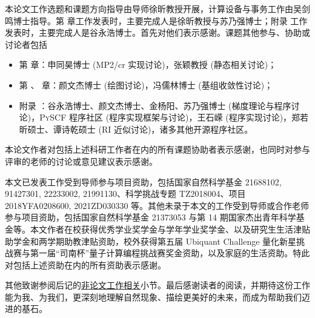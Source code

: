 
\begin{acknowledgements}
\label{sec.acknoledge}

本论文工作选题和课题方向指导由导师徐昕教授开展，计算设备与事务工作由吴剑鸣博士指导。第  章工作发表时，主要完成人是徐昕教授与苏乃强博士；附录  工作发表时，主要完成人是谷永浩博士。首先对他们表示感谢。课题其他参与、协助或讨论者包括
\begin{itemize}[nosep]
    \item 第  章：申同昊博士 (MP2/cr 实现讨论)，张颖教授 (静态相关讨论)；
    \item 第 、 章：颜文杰博士 (绘图讨论)，冯儒林博士 (基组收敛性讨论)；
    \item 附录 ：谷永浩博士、颜文杰博士、金杨阳、苏乃强博士 (梯度理论与程序讨论)，\textsc{PySCF} 程序社区 (程序实现框架与讨论)，王石嵘 (程序实现讨论)，郑若昕硕士、谭诗乾硕士 (RI 近似讨论)，诸多其他开源程序社区。
\end{itemize}
本论文作者对包括上述科研工作者在内的所有课题协助者表示感谢，也同时对参与评审的老师的讨论或意见建议表示感谢。

本文已发表工作受到导师参与项目资助，包括国家自然科学基金 21688102, 91427301, 22233002, 21991130、科学挑战专题 TZ2018004、项目 2018YFA0208600, 2021ZD030330 等。其他未录于本文的工作受到导师或合作老师参与项目资助，包括国家自然科学基金 21373053 与第 14 期国家杰出青年科学基金等。本文作者在校获得优秀学业奖学金与学年学业奖学金、以及研究生生活津贴助学金和两学期助教津贴资助，校外获得第五届 Ubiquant Challenge 量化新星挑战赛与第一届“司南杯”量子计算编程挑战赛奖金资助，以及家庭的生活资助。特此对包括上述资助在内的所有资助表示感谢。

其他致谢参阅后记的\hyperref[sec.finale.acknoledge]{非论文工作相关}小节。最后感谢读者的阅读，并期待这份工作能为我、为我们，更深刻地理解自然现象、描绘更美好的未来，而成为帮助我们迈进的基石。

\end{acknowledgements}
